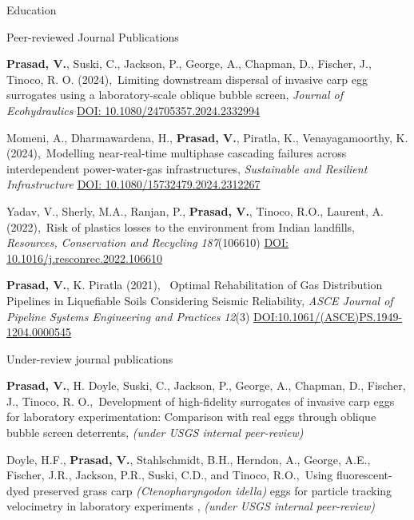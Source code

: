 \documentclass{resume} %
\begin{document}
\begin{rSection}{Education}
\begin{rSection}{Peer-reviewed Journal Publications}
\item \textbf{Prasad, V.}, Suski, C., Jackson, P., George, A., Chapman, D., Fischer, J., Tinoco, R. O. (2024),\ {Limiting downstream dispersal of invasive carp egg surrogates using a laboratory-scale oblique bubble screen, \textit{Journal of Ecohydraulics} \href{https://doi.org/10.1080/24705357.2024.2332994}{DOI: 10.1080/24705357.2024.2332994}} \\

\item Momeni, A., Dharmawardena, H., \textbf{Prasad, V.}, Piratla, K., Venayagamoorthy, K. (2024),\ {Modelling near-real-time multiphase cascading failures across interdependent power-water-gas infrastructures, \textit{Sustainable and Resilient Infrastructure} \href{https://www.tandfonline.com/doi/full/10.1080/15732479.2024.2312267}{DOI: 10.1080/15732479.2024.2312267}} \\

\item {Yadav, V., Sherly, M.A., Ranjan, P.,} \textbf {Prasad, V.}, Tinoco, R.O., Laurent, A. (2022),\ {Risk of plastics losses to the environment from Indian landfills, \textit{Resources, Conservation and Recycling} \textit{187}(106610) \href{https://www.sciencedirect.com/science/article/pii/S092134492200444X}{DOI: 10.1016/j.resconrec.2022.106610}} \\

\item \textbf{Prasad, V.}, K. Piratla (2021), \ {Optimal Rehabilitation of Gas Distribution Pipelines in Liquefiable Soils Considering Seismic Reliability, \textit{ASCE Journal of Pipeline Systems Engineering and Practices} \textit{12}(3) \href{https://ascelibrary.org/doi/abs/10.1061/(ASCE)PS.1949-1204.0000545}{DOI:10.1061/(ASCE)PS.1949-1204.0000545}} 
 
\end{rSection}

\begin{rSection} {Under-review journal publications} \itemsep -2pt

\item \textbf{Prasad, V.}, H. Doyle, Suski, C., Jackson, P., George, A., Chapman, D., Fischer, J., Tinoco, R. O.,\ {Development of high-fidelity surrogates of invasive carp eggs for laboratory experimentation: Comparison with real eggs through oblique bubble screen deterrents}, \textit{(under USGS internal peer-review)} \\

\item Doyle, H.F., \textbf{Prasad, V.}, Stahlschmidt, B.H., Herndon, A., George, A.E., Fischer, J.R., Jackson, P.R., Suski, C.D., and Tinoco, R.O.,\ {Using fluorescent-dyed preserved grass carp \textit{(Ctenopharyngodon idella)} eggs for particle tracking velocimetry in laboratory experiments }, \textit{(under USGS internal peer-review)} \\
\end{rSection}


\end{rSection}
\end{document}
